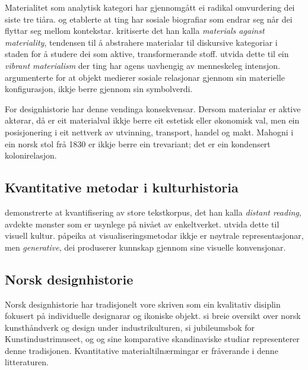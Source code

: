 \documentclass[12pt,a4paper]{article}
\begin{document}
Materialitet som analytisk kategori har gjennomg\aa{}tt ei radikal omvurdering dei siste tre ti\aa{}ra. \citet{appadurai1986} og \citet{kopytoff1986} etablerte at ting har sosiale biografiar som endrar seg n\aa{}r dei flyttar seg mellom kontekstar. \citet{ingold2007} kritiserte det han kalla \emph{materials against materiality}, tendensen til \aa{} abstrahere materialar til diskursive kategoriar i staden for \aa{} studere dei som aktive, transformerande stoff. \citet{bennett2010} utvida dette til ein \emph{vibrant materialism} der ting har agens uavhengig av menneskeleg intensjon. \citet{pels2002} argumenterte for at objekt medierer sosiale relasjonar gjennom sin materielle konfigurasjon, ikkje berre gjennom sin symbolverdi.

For designhistorie har denne vendinga konsekvensar. Dersom materialar er aktive akt\o{}rar, d\aa{} er eit materialval ikkje berre eit estetisk eller \o{}konomisk val, men ein posisjonering i eit nettverk av utvinning, transport, handel og makt. Mahogni i ein norsk stol fr\aa{} 1830 er ikkje berre ein trevariant; det er ein kondensert kolonirelasjon.

\subsection{Kvantitative metodar i kulturhistoria}

\citet{moretti2005,moretti2013} demonstrerte at kvantifisering av store tekstkorpus, det han kalla \emph{distant reading}, avdekte m\o{}nster som er usynlege p\aa{} niv\aa{}et av enkeltverket. \citet{manovich2020} utvida dette til visuell kultur. \citet{drucker2014} p\aa{}peika at visualiseringsmetodar ikkje er n\o{}ytrale representasjonar, men \emph{generative}, dei produserer kunnskap gjennom sine visuelle konvensjonar.

\subsection{Norsk designhistorie}

Norsk designhistorie har tradisjonelt vore skriven som ein kvalitativ disiplin fokusert p\aa{} individuelle designarar og ikoniske objekt. \citet{wildhagen1988} si breie oversikt over norsk kunsth\aa{}ndverk og design under industrikulturen, \citet{opstad2005} si jubileumsbok for Kunstindustrimuseet, og \citet{halen2003} og \citet{wickman2006} sine komparative skandinaviske studiar representerer denne tradisjonen. Kvantitative materialtilnærmingar er fråverande i denne litteraturen.
\end{document}
